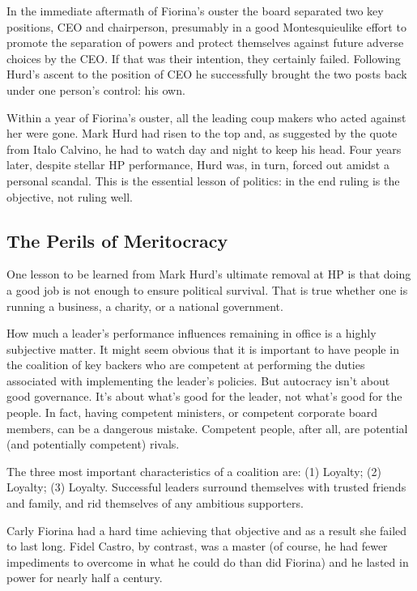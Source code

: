 \documentclass[10pt]{article}
\begin{document}
{\large In the immediate aftermath of Fiorina's ouster the board separated two
key positions, CEO and chairperson, presumably in a good Montesquieulike effort
to promote the separation of powers and protect themselves against future adverse
choices by the CEO. If that was their intention, they certainly failed. Following
Hurd's ascent to the position of CEO he successfully brought the two posts back
under one person's control: his own.}

{\large Within a year of Fiorina's ouster, all the leading coup makers who acted
against her were gone. Mark Hurd had risen to the top and, as suggested by the
quote from Italo Calvino, he had to watch day and night to keep his head. Four
years later, despite stellar HP performance, Hurd was, in turn, forced out amidst
a personal scandal. This is the essential lesson of politics: in the end ruling
is the objective, not ruling well.}

\subsection{The Perils of Meritocracy}

{\large One lesson to be learned from Mark Hurd's ultimate removal at HP is that
doing a good job is not enough to ensure political survival. That is true whether
one is running a business, a charity, or a national government.}

{\large How much a leader's performance influences remaining in office is a
highly subjective matter. It might seem obvious that it is important to have
people in the coalition of key backers who are competent at performing the duties
associated with implementing the leader's policies. But autocracy isn't about
good governance. It's about what's good for the leader, not what's good for the
people. In fact, having competent ministers, or competent corporate board
members, can be a dangerous mistake. Competent people, after all, are potential
(and potentially competent) rivals.}

{\large The three most important characteristics of a coalition are: (1)
Loyalty; (2) Loyalty; (3) Loyalty. Successful leaders surround themselves with
trusted friends and family, and rid themselves of any ambitious supporters.}

{\large Carly Fiorina had a hard time achieving that objective and as a result
she failed to last long. Fidel Castro, by contrast, was a master (of course, he
had fewer impediments to overcome in what he could do than did Fiorina) and he
lasted in power for nearly half a century.}
\end{document}
